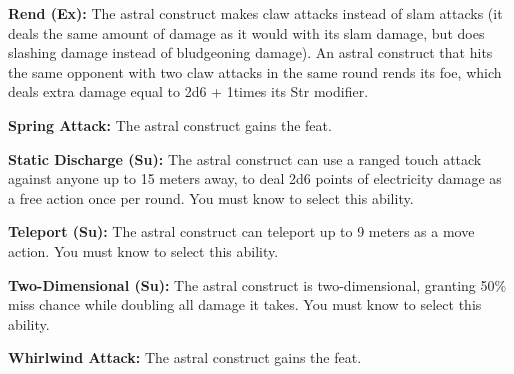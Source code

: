 {	%

	\textbf{Rend (Ex):} The astral construct makes claw attacks instead of slam attacks (it deals the same amount of damage as it would with its slam damage, but does slashing damage instead of bludgeoning damage). An astral construct that hits the same opponent with two claw attacks in the same round rends its foe, which deals extra damage equal to 2d6 + 1\onehalf times its Str modifier.

	\textbf{Spring Attack:} The astral construct gains the  feat.

	\textbf{Static Discharge (Su):} The astral construct can use a ranged touch attack against anyone up to 15 meters away, to deal 2d6 points of electricity damage as a free action once per round. You must know  to select this ability.

	\textbf{Teleport (Su):} The astral construct can teleport up to 9 meters as a move action. You must know  to select this ability.

	\textbf{Two-Dimensional (Su):} The astral construct is two-dimensional, granting 50\% miss chance while doubling all damage it takes. You must know  to select this ability.

	\textbf{Whirlwind Attack:} The astral construct gains the  feat. 
}